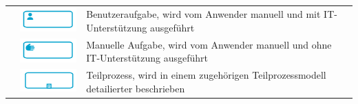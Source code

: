 \begin{table}[H]
\begin{tabularx}{\textwidth}{l c X}
		 &   
		\begin{minipage}{.2\textwidth}
            \includegraphics[width=\linewidth]{img/user.png}
        \end{minipage}  &
		Benutzeraufgabe, wird vom Anwender manuell und mit \ac{IT}-Unterstützung ausgeführt        \\   \cmidrule(r){2-2} \cmidrule(r){3-3}
		
		 &   
		\begin{minipage}{.2\textwidth}
            \includegraphics[width=\linewidth]{img/manual.png}
        \end{minipage}  &
		Manuelle Aufgabe, wird vom Anwender manuell und ohne \ac{IT}-Unterstützung ausgeführt        \\  \cmidrule(r){2-2} \cmidrule(r){3-3}
		
				 &   
		\begin{minipage}{.2\textwidth}
            \includegraphics[width=\linewidth]{img/subprocess.png}
        \end{minipage}  &
		Teilprozess, wird in einem zugehörigen Teilprozessmodell detailierter beschrieben        \\  \cmidrule(r){1-1} \cmidrule(r){2-2} \cmidrule(r){3-3}
		

\end{tabularx}
\end{table}
